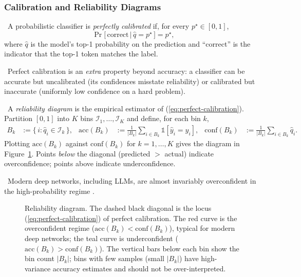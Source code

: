 \subsubsection{Calibration and Reliability Diagrams}

\Def\ A probabilistic classifier is \emph{perfectly calibrated} if,
for every $p^\star \in [0, 1]$,
\begin{equation}
\Pr\!\big[\,\text{correct} \,\big|\, \hat q = p^\star\,\big] = p^\star,
\label{eq:perfect-calibration}
\end{equation}
where $\hat q$ is the model's top-1 probability on the prediction and
``correct'' is the indicator that the top-1 token matches the label.

\Ident\ Perfect calibration is an \emph{extra} property beyond
accuracy: a classifier can be accurate but uncalibrated (its
confidences misstate reliability) or calibrated but inaccurate
(uniformly low confidence on a hard problem).

\Def\ A \emph{reliability diagram} is the empirical estimator of
(\ref{eq:perfect-calibration}). Partition $[0,1]$ into $K$ bins
$\mathcal{I}_1, \ldots, \mathcal{I}_K$ and define, for each bin $k$,
\begin{align}
B_k &:= \{\, i : \hat q_i \in \mathcal{I}_k \,\}, &
\mathrm{acc}(B_k) &:= \frac{1}{|B_k|} \sum_{i \in B_k} \mathbb{1}[\hat y_i = y_i], &
\mathrm{conf}(B_k) &:= \frac{1}{|B_k|} \sum_{i \in B_k} \hat q_i.
\label{eq:bin-defs}
\end{align}
Plotting $\mathrm{acc}(B_k)$ against $\mathrm{conf}(B_k)$ for $k = 1,
\ldots, K$ gives the diagram in Figure~\ref{fig:reliability}. Points
\emph{below} the diagonal (predicted $>$ actual) indicate
overconfidence; points above indicate underconfidence.

\Emp\ Modern deep networks, including LLMs, are almost invariably
overconfident in the high-probability regime
\citep{guo2017calibration}.

\begin{figure}[H]
  \centering
  
  \caption{Reliability diagram. The dashed black diagonal is the
           locus (\ref{eq:perfect-calibration}) of perfect calibration.
           The red curve is the overconfident regime
           ($\mathrm{acc}(B_k) < \mathrm{conf}(B_k)$), typical for
           modern deep networks; the teal curve is underconfident
           ($\mathrm{acc}(B_k) > \mathrm{conf}(B_k)$). The vertical
           bars below each bin show the bin count $|B_k|$; bins with
           few samples (small $|B_k|$) have high-variance accuracy
           estimates and should not be over-interpreted.}
  \label{fig:reliability}
\end{figure}

